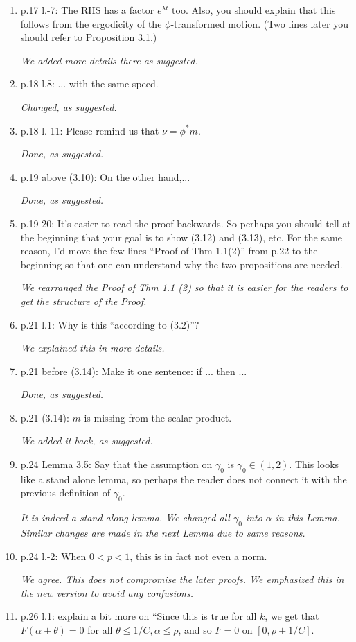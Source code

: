 \documentclass[12pt,a4paper]{amsart}
\numberwithin{equation}{section}
\theoremstyle{plain}
\theoremstyle{definition}
\begin{document}
\begin{enumerate}
  {\it We gave an intuitive explanations in the paragraph before those bullet points. }
\item
  p.17 l.-7: The RHS has a factor $e^{\lambda t}$ too.
  Also, you should explain that this follows from the ergodicity of the $\phi$-transformed motion.
  (Two lines later you should refer to Proposition 3.1.)

  {\it We added more details there as suggested.}
\item
  p.18 l.8: ... with the same speed.

  {\it Changed, as suggested.}
\item
  p.18 l.-11: Please remind us that $\nu = \phi^* m$.

  {\it Done, as suggested.}
\item
  p.19 above (3.10): On the other hand,...

  {\it Done, as suggested.}
\item
  p.19-20: It's easier to read the proof backwards. So perhaps you should tell at the beginning that your goal is to show (3.12) and (3.13), etc.
  For the same reason, I'd move the few lines ``Proof of Thm 1.1(2)'' from p.22 to the beginning so that one can understand why the two propositions are needed.

  {\it We rearranged the Proof of Thm 1.1 (2) so that it is easier for the readers to get the structure of the Proof. }
\item
  p.21 l.1: Why is this ``according to (3.2)''?

  {\it We explained this in more details.}
\item
  p.21 before (3.14): Make it one sentence: if ... then ...

  {\it Done, as suggested.}
\item
  p.21 (3.14): $m$ is missing from the scalar product.

  {\it We added it back, as suggested.}
\item
  p.24 Lemma 3.5: Say that the assumption on $\gamma_0$ is $\gamma_0 \in (1,2)$.
  This looks like a stand alone lemma, so perhaps the reader does not connect it with the previous definition of $\gamma_0$.

  {\it It is indeed a stand along lemma.
    We changed all $\gamma_0$ into $\alpha$ in this Lemma.
    Similar changes are made in the next Lemma due to same reasons.}
\item
  p.24 l.-2: When $0 < p < 1$, this is in fact not even a norm.

  {\it We agree.
    This does not compromise the later proofs.
    We emphasized this in the new version to avoid any confusions.}
\item
  p.26 l.1: explain a bit more on ``Since this is true for all $k$, we get that $F(\alpha+\theta) = 0$ for all $\theta \leq 1/C, \alpha \leq \rho$, and so $F = 0$ on $[0, \rho+1/C]$.


\end{enumerate}
\end{document}
